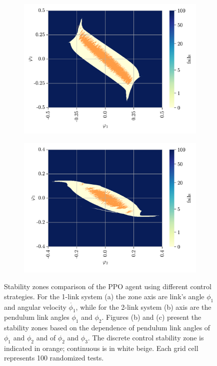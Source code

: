 \begin{figure}[h!]
	\vspace{0.2cm}
	
	\begin{subfigure}[t]{0.48\textwidth}
		\centering
		\includegraphics[width=\textwidth]{Figures/TP_continuous_vs_discrete_phi1phi2.png}
		\label{fig: tp - continuous vs discrete, phi1 phi2}
		\caption{}
	\end{subfigure}
	\hfill
	\begin{subfigure}[t]{0.48\textwidth}
		\centering
		\includegraphics[width=\textwidth]{Figures/TP_continuous_vs_discrete_phi2phi3.png}
		\label{fig: tp - continuous vs discrete, phi2 phi3}
		\caption{}
	\end{subfigure}
	
	\caption{Stability zones comparison of the PPO agent using different control strategies. For the 1-link system (a) the zone axis are link's angle $\phi_1$ and angular velocity $\dot{\phi_1}$, while for the 2-link system (b) axis are the pendulum link angles $\phi_1$ and $\phi_2$. Figures (b) and (c) present the stability zones based on the dependence of pendulum link angles of $\phi_1$ and $\phi_2$ and of $\phi_2$ and $\phi_3$. The discrete control stability zone is indicated in orange; continuous is in white beige. Each grid cell represents 100 randomized tests.}
	\label{fig: continuous vs discrete}
\end{figure}

